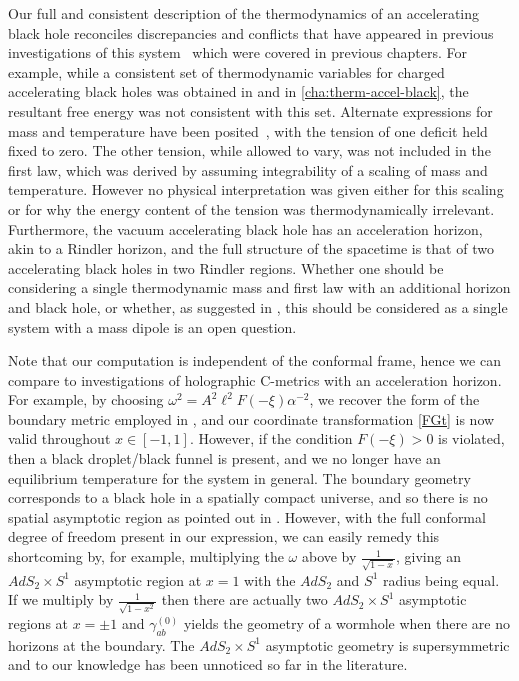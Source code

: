 \documentclass[
twoside,
openright,
frontopenright,
]{dmathesis}
\begin{document}
Our full and consistent description of the thermodynamics of an accelerating
black hole reconciles discrepancies and conflicts that have appeared in previous
investigations of this system~\cite{Appels:2016uha,
  Appels:2017xoe,Astorino:2016ybm} which were covered in previous chapters.  For
example, while a consistent set of thermodynamic variables for charged
accelerating black holes was obtained in
\cite{Appels:2016uha,Appels:2017xoe,Gregory:2017ogk} and in
\cref{cha:therm-accel-black}, the resultant free energy was not consistent with
this set.  Alternate expressions for mass and temperature have been
posited~\cite{Astorino:2016ybm}, with the tension of one deficit held fixed to
zero.  The other tension, while allowed to vary, was not included in the first
law, which was derived by assuming integrability of a scaling of mass and
temperature.  However no physical interpretation was given either for this
scaling or for why the energy content of the tension was thermodynamically
irrelevant.  Furthermore, the vacuum accelerating black hole has an acceleration
horizon, akin to a Rindler horizon, and the full structure of the spacetime is
that of two accelerating black holes in two Rindler regions. Whether one should
be considering a single thermodynamic mass and first law with an additional
horizon and black hole, or whether, as suggested in \cite{Dutta:2005iy}, this
should be considered as a single system with a mass dipole is an open question.

Note that our computation is independent of the conformal frame, hence
we can compare to investigations of holographic C-metrics with an
acceleration horizon. For example, by choosing $\omega^2 =
A^2\ell^2F(-\xi)\alpha^{-2}$, we recover the form of the boundary metric
employed in \cite{Hubeny:2009kz}, and our coordinate transformation
\eqref{FGt} is now valid throughout $x\in[-1,1]$. However, if the condition
$ F(-\xi)>0$ is violated, then a black droplet/black funnel is present,
and we no longer have an equilibrium temperature for the system in general.
The boundary geometry corresponds to a black hole in a spatially compact
universe, and so there is no spatial asymptotic region as pointed out
in \cite{Hubeny:2009kz}. However, with the full conformal degree of
freedom present in our expression, we can easily remedy this shortcoming
by, for example, multiplying the $\omega$ above by $\frac{1}{\sqrt{1-x}}$,
giving an $AdS_{2}\times S^{1}$ asymptotic region at $x=1$ with the $AdS_{2}$
and $S^{1}$ radius being equal. If we multiply by $\frac{1}{\sqrt{1-x^2}}$ then
there are actually two $AdS_{2}\times S^{1}$ asymptotic regions at $x=\pm1$
and $\gamma^{(0)}_{ab}$ yields the geometry of a wormhole when there are no
horizons at the boundary.
The $AdS_{2}\times S^{1}$ asymptotic geometry is supersymmetric
and to our knowledge has been unnoticed so far in the literature.
\end{document}
